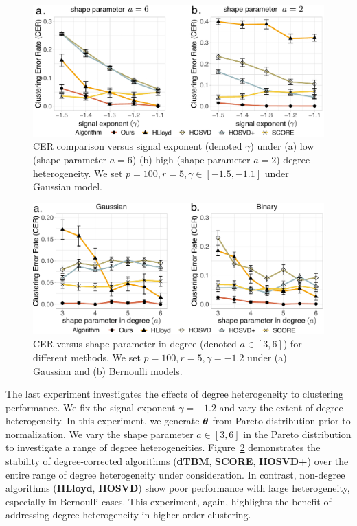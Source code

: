 \documentclass[journal]{IEEEtran}
\theoremstyle{definition}
\theoremstyle{definition}
\begin{document}
\begin{figure}[htp!]
    \centering
    \includegraphics[width=\columnwidth]{comp_gamma_theta3.pdf}
    \caption{CER comparison versus signal exponent (denoted $\gamma$) under (a) low (shape parameter $a = 6$)  (b) high (shape parameter $a = 2$) degree heterogeneity. We set $p = 100, r = 5, \gamma \in [-1.5, -1.1]$ under Gaussian model.}
    \label{fig:comp_gamma_theta}
\end{figure}

\begin{figure}[h!]
    \centering
    \includegraphics[width=\columnwidth]{comp_theta_anno3.pdf}
    \caption{CER versus shape parameter in degree (denoted $a\in[3,6]$) for different methods. We set $p = 100, r = 5, \gamma = -1.2$ under (a) Gaussian and (b) Bernoulli models.}
    \label{fig:comp_theta}
\end{figure}



The last experiment investigates the effects of degree heterogeneity to clustering performance. We fix the signal exponent $\gamma = -1.2$ and vary the extent of degree heterogeneity. In this experiment, we generate $\boldsymbol{\theta}$ from Pareto distribution prior to normalization. We vary the shape parameter $a \in [3,6]$ in the Pareto distribution to investigate a range of degree heterogeneities. Figure~\ref{fig:comp_theta} demonstrates the stability of degree-corrected algorithms (\textbf{\small dTBM}, \textbf{\small SCORE}, \textbf{\small HOSVD+}) over the entire range of degree heterogeneity under consideration. In contrast, non-degree algorithms (\textbf{\small HLloyd}, \textbf{\small HOSVD}) show poor performance with large heterogeneity, especially in Bernoulli cases. This experiment, again, highlights the benefit of addressing degree heterogeneity in higher-order clustering. 
\end{document}

